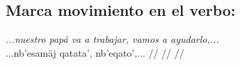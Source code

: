 \documentclass{article}%
\begin{document}
\subsection{Marca movimiento en el verbo:}%
\label{subsec:Marcamovimientoenelverbo}%

%
\par\medskip%
\ex
\textit{...nuestro papá va a trabajar, vamos a ayudarlo,...} \\
\begingl
\gla ...nb'esamäj qatata', nb'eqato',... //
\glb  //
\glc  //
\endgl
\xe
%
\medskip

%
\end{document}
